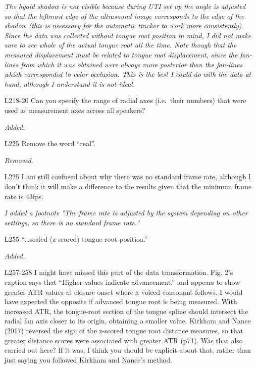 \documentclass[]{article}
\begin{document}
\begin{adjustwidth}{1cm}{} \textit{
The hyoid shadow is not visible because during UTI set up the angle is adjusted so that the leftmost edge of the ultrasound image corresponds to the edge of the shadow (this is necessary for the automatic tracker to work more consistently). Since the data was collected without tongue root position in mind, I did not make sure to see whole of the actual tongue root all the time. Note though that the measured displacement must be related to tongue root displacement, since the fan-lines from which it was obtained were always more posterior than the fan-lines which corresponded to velar occlusion. This is the best I could do with the data at hand, although I understand it is not ideal.
} \end{adjustwidth}

L218-20 Can you specify the range of radial axes (i.e.~their numbers)
that were used as measurement axes across all speakers?

\begin{adjustwidth}{1cm}{} \textit{
Added.
} \end{adjustwidth}

L225 Remove the word ``real''.

\begin{adjustwidth}{1cm}{} \textit{
Removed.
} \end{adjustwidth}

L225 I am still confused about why there was no standard frame rate,
although I don't think it will make a difference to the results given
that the minimum frame rate is 43fps.

\begin{adjustwidth}{1cm}{} \textit{
I added a footnote "The frame rate is adjusted by the system depending on other settings, so there is no standard frame rate."
} \end{adjustwidth}

L255 ``\ldots{}scaled (z-scored) tongue root position.''

\begin{adjustwidth}{1cm}{} \textit{
Added.
} \end{adjustwidth}

L257-258 I might have missed this part of the data transformation. Fig.
2's caption says that ``Higher values indicate advancement.'' and
appears to show greater ATR values at closure onset where a voiced
consonant follows. I would have expected the opposite if advanced tongue
root is being measured. With increased ATR, the tongue-root section of
the tongue spline should intersect the radial fan axis closer to its
origin, obtaining a smaller value. Kirkham and Nance (2017) reversed the
sign of the z-scored tongue root distance measures, so that greater
distance scores were associated with greater ATR (p71). Was that also
carried out here? If it was, I think you should be explicit about that,
rather than just saying you followed Kirkham and Nance's method.
\end{document}
